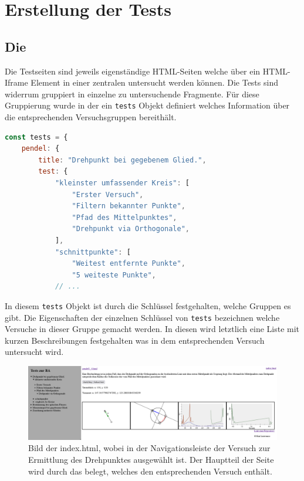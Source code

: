 
\chapter{Erstellung der Tests}


\section{Die }

Die Testseiten sind jeweils eigenständige HTML-Seiten welche über ein HTML-Iframe Element in einer zentralen  untersucht werden können.
Die Tests sind widerrum gruppiert in einzelne zu untersuchende Fragmente.
Für diese Gruppierung wurde in der  ein \lstinline{tests} Objekt definiert welches Information über die entsprechenden Versuchsgruppen bereithält.

\begin{lstlisting}[language=JavaScript, caption={Ausschnitt der Definition des \lstinline{tests} Objekts in der \name{index.html}.}, label={lst:tests_objekt}]
const tests = {
    pendel: {
        title: "Drehpunkt bei gegebenem Glied.",
        test: {
            "kleinster umfassender Kreis": [
                "Erster Versuch",
                "Filtern bekannter Punkte",
                "Pfad des Mittelpunktes",
                "Drehpunkt via Orthogonale",
            ],
            "schnittpunkte": [
                "Weitest entfernte Punkte",
                "5 weiteste Punkte",
            // ...
\end{lstlisting}

In diesem \lstinline{tests} Objekt ist durch die Schlüssel festgehalten, welche Gruppen es gibt. Die Eigenschaften der einzelnen Schlüssel von \lstinline{tests} bezeichnen welche Versuche in dieser Gruppe gemacht werden.
In diesen wird letztlich eine Liste mit kurzen Beschreibungen festgehalten was in dem entsprechenden Versuch untersucht wird.

\begin{figure}
    \includegraphics[width=\textwidth]{gfx/index.png}
    \caption[Bild der index.html]{Bild der index.html, wobei in der Navigationsleiste der Versuch zur Ermittlung des Drehpunktes ausgewählt ist. Der Hauptteil der Seite wird durch das  belegt, welches den entsprechenden Versuch enthält.}\label{fig:index.html}
\end{figure}

